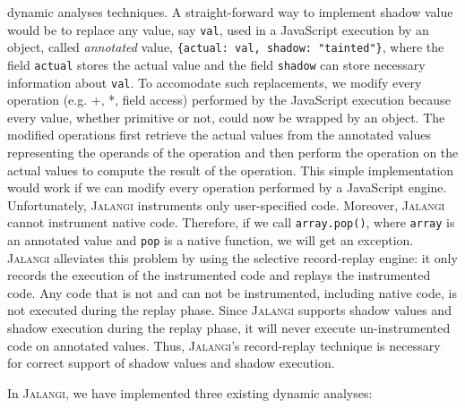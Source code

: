 \documentclass{sig-alternate}
\def\jalangi{\textsc{Jalangi}}
\begin{document}
\begin{enumerate}
  dynamic analyses techniques.  A straight-forward way to implement
  shadow value would be to replace any value, say \texttt{val}, used
  in a JavaScript execution by an object, called \emph{annotated}
  value, \texttt{\{actual: val, shadow: "tainted"\}}, where the field
  \texttt{actual} stores the actual value and the field
  \texttt{shadow} can store necessary information about \texttt{val}.
  To accomodate such replacements, we modify every operation (e.g. +,
  *, field access) performed by the JavaScript execution because every
  value, whether primitive or not, could now be wrapped by an object.
  The modified operations first retrieve the actual values from
  the annotated values representing the operands of the operation and
  then perform the operation on the actual values to compute the
  result of the operation.  %
  This simple implementation would work if we can modify every
  operation performed by a JavaScript engine.  Unfortunately,
  \jalangi{} instruments only user-specified code. Moreover,
  \jalangi{} cannot instrument native code.  Therefore, if we call
  \texttt{array.pop()}, where \texttt{array} is an annotated value and
  \texttt{pop} is a native function, we will get an exception.
  \jalangi{} alleviates this problem by using the selective
  record-replay engine: it only records the execution of the
  instrumented code and replays the instrumented code.  Any code that
  is not and can not be instrumented, including native code, is not
  executed during the replay phase.  Since \jalangi{} supports shadow
  values and shadow execution during the replay phase, it will never
  execute un-instrumented code on annotated values.  Thus, \jalangi's
  record-replay technique is necessary for correct support of shadow
  values and shadow execution.
\end{enumerate}

In \jalangi{}, we have implemented three existing dynamic analyses:
\end{document}
